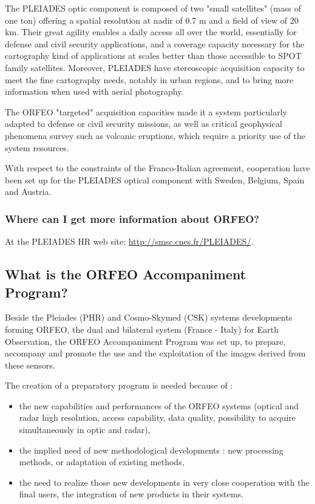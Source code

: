 The PLEIADES optic component is composed of two "small satellites"
(mass of one ton) offering a spatial resolution at nadir of 0.7 m and
a field of view of 20 km. Their great agility enables a daily access
all over the world, essentially for defense and civil security
applications, and a coverage capacity necessary for the cartography
kind of applications at scales better than those accessible to SPOT
family satellites. Moreover, PLEIADES have stereoscopic
acquisition capacity to meet the fine cartography needs, notably in
urban regions, and to bring more information when used with aerial
photography.

The ORFEO "targeted" acquisition capacities made it a system
particularly adapted to defense or civil security missions, as well as
critical geophysical phenomena survey such as volcanic eruptions,
which require a priority use of the system resources.

With respect to the constraints of the Franco-Italian agreement,
cooperation have been set up for the PLEIADES optical component with
Sweden, Belgium, Spain and Austria.

\subsubsection{Where can I get more information about ORFEO?}
At the PLEIADES HR web site: \url{http://smsc.cnes.fr/PLEIADES/}.

\subsection{What is the ORFEO Accompaniment Program?}
Beside the Pleiades (PHR) and Cosmo-Skymed (CSK) systems developments forming ORFEO, the dual and bilateral system (France - Italy) for Earth Observation, the ORFEO Accompaniment Program was set up, to prepare, accompany and promote the use and the exploitation of the images derived from these sensors.

The creation of a preparatory program is needed because of :
\begin{itemize}
  \item the new capabilities and performances of the ORFEO systems (optical and radar high resolution, access capability, data quality, possibility to acquire simultaneously in optic and radar),
  \item the implied need of new methodological developments : new processing methods, or adaptation of existing methods,
  \item the need to realize those new developments in very close cooperation with the final users, the integration of new products in their systems.
\end{itemize}


